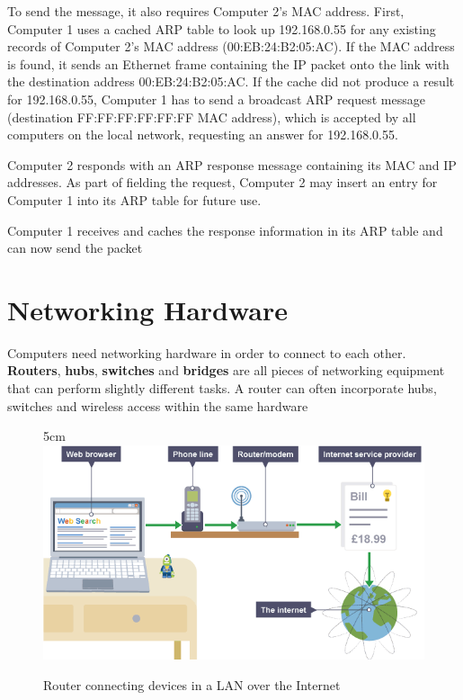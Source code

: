 \documentclass[a4paper,12pt]{article}
\begin{document}
To send the message, it also requires Computer 2's MAC address. First, Computer 1 uses a cached ARP table to look up 192.168.0.55 for any existing records of Computer 2's MAC address (00:EB:24:B2:05:AC). If the MAC address is found, it sends an Ethernet frame containing the IP packet onto the link with the destination address 00:EB:24:B2:05:AC. If the cache did not produce a result for 192.168.0.55, Computer 1 has to send a broadcast ARP request message (destination FF:FF:FF:FF:FF:FF MAC address), which is accepted by all computers on the local network, requesting an answer for 192.168.0.55.

Computer 2 responds with an ARP response message containing its MAC and IP addresses. As part of fielding the request, Computer 2 may insert an entry for Computer 1 into its ARP table for future use.

Computer 1 receives and caches the response information in its ARP table and can now send the packet

\clearpage

\section{Networking Hardware}
Computers need networking hardware in order to connect to each other. \textbf{Routers}, \textbf{hubs}, \textbf{switches} and \textbf{bridges} are all pieces of networking equipment that can perform slightly different tasks. A router can often incorporate hubs, switches and wireless access within the same hardware

\begin{figure}[18]{5cm}
\centering
\includegraphics[width=16cm]{./large.PNG}
\caption{Router connecting devices in a LAN over the Internet}\label{wrap-fig:5}
\end{figure}
\end{document}
